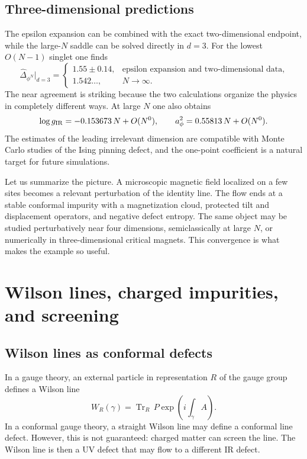 \documentclass[11pt]{article}
\begin{document}
\subsection{Three-dimensional predictions}

The epsilon expansion can be combined with the exact two-dimensional endpoint,
while the large-$N$ saddle can be solved directly in $d=3$.  For the lowest
$O(N-1)$ singlet one finds
\begin{equation}
  \widehat\Delta_{\phi^N}\big|_{d=3}
  =
  \begin{cases}
    1.55\pm0.14, & \text{epsilon expansion and two-dimensional data},\\
    1.542\ldots, & N\to\infty .
  \end{cases}
\end{equation}
The near agreement is striking because the two calculations organize the
physics in completely different ways.  At large $N$ one also obtains
\begin{equation}
  \log g_{\rm IR}=-0.153673\,N+O(N^0),
  \qquad
  a_\phi^2=0.55813\,N+O(N^0) .
\end{equation}
The estimates of the leading irrelevant dimension are compatible with Monte
Carlo studies of the Ising pinning defect, and the one-point coefficient is a
natural target for future simulations.

Let us summarize the picture.  A microscopic magnetic field localized on a
few sites becomes a relevant perturbation of the identity line.  The flow ends
at a stable conformal impurity with a magnetization cloud, protected tilt and
displacement operators, and negative defect entropy.  The same object may be
studied perturbatively near four dimensions, semiclassically at large $N$, or
numerically in three-dimensional critical magnets.  This convergence is what
makes the example so useful.

\section{Wilson lines, charged impurities, and screening}

\subsection{Wilson lines as conformal defects}

In a gauge theory, an external particle in representation $R$ of the gauge group defines a Wilson line
\begin{equation}
  W_R(\gamma)=\operatorname{Tr}_R\,P\exp\left(i\int_\gamma A\right) .
\end{equation}
In a conformal gauge theory, a straight Wilson line may define a conformal line defect.  However, this is not guaranteed: charged matter can screen the line.  The Wilson line is then a UV defect that may flow to a different IR defect.
\end{document}
